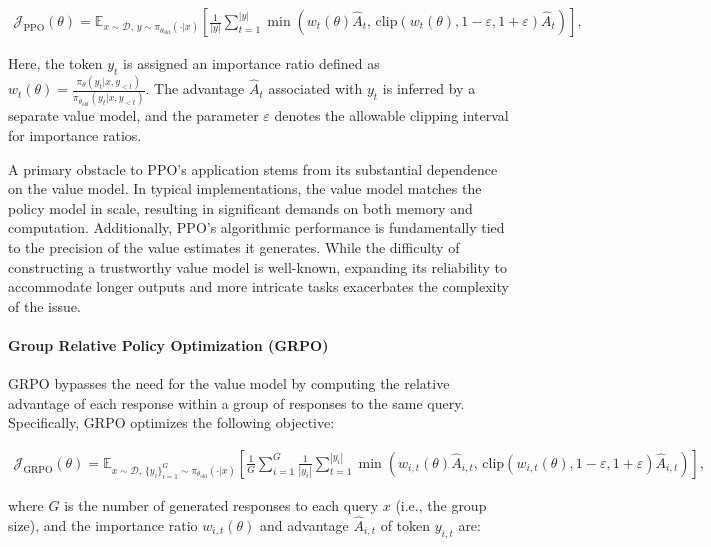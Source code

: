 \begin{align}
\mathcal{J}_\text{PPO}(\theta) = \mathbb{E}_{ x \sim \mathcal{D},\, y \sim \pi_{\theta_\text{old}}( \cdot | x) }
\left[ \frac{1}{|y|} \sum_{t=1}^{|y|} 
\min \left( w_{t}(\theta) \widehat{A}_{t},  \, \mathrm{clip} \left( w_{t}(\theta), 1 - {\varepsilon}, 1 + {\varepsilon}\right) \widehat{A}_{t} \right)
\right],
\end{align}

Here, the token $y_t$ is assigned an importance ratio defined as $
w_{t}(\theta) = \frac{ \pi_{\theta} (y_{t} | x, y_{<t}) }{ \pi_{\theta_\text{old}} (y_{t} | x,y_{<t})} $. The advantage $\widehat{A}_{t}$ associated with $y_t$ is inferred by a separate value model, and the parameter $\varepsilon$ denotes the allowable clipping interval for importance ratios.

A primary obstacle to PPO's application stems from its substantial dependence on the value model. In typical implementations, the value model matches the policy model in scale, resulting in significant demands on both memory and computation. Additionally, PPO's algorithmic performance is fundamentally tied to the precision of the value estimates it generates. While the difficulty of constructing a trustworthy value model is well-known, expanding its reliability to accommodate longer outputs and more intricate tasks exacerbates the complexity of the issue.

\paragraph{Group Relative Policy Optimization (GRPO)} GRPO \citep{grpo} bypasses the need for the value model by computing the relative advantage of each response within a group of responses to the same query. Specifically, GRPO optimizes the following objective:

\begin{align}
\label{equ:grpo}
\mathcal{J}_\text{GRPO}(\theta) = \mathbb{E}_{ x \sim \mathcal{D},\, \{y_i\}_{i=1}^G \sim \pi_{\theta_\text{old}}( \cdot | x) }
\left[ \frac{1}{G} \sum_{i=1}^{G} \frac{1}{|y_i|} \sum_{t=1}^{|y_i|} 
\min \left( w_{i,t}(\theta) \widehat{A}_{i,t},  \, \mathrm{clip} \left( w_{i,t}(\theta), 1 - {\varepsilon}, 1 + {\varepsilon}\right) \widehat{A}_{i,t} \right)
\right],
\end{align}

where $G$ is the number of generated responses to each query $x$ (i.e., the group size), and the importance ratio $w_{i,t}(\theta)$ and advantage $\widehat{A}_{i,t}$ of token $y_{i,t}$ are:

